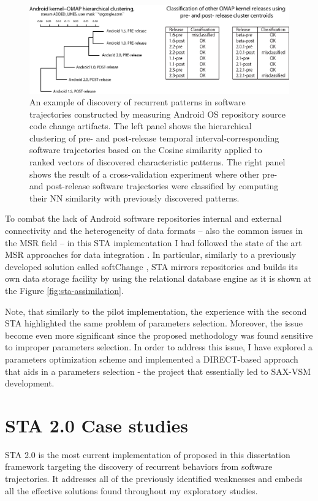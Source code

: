 \begin{figure}[t]
   \centering
   \includegraphics[width=145mm]{figures/STA2.eps}
   \caption{An example of discovery of recurrent patterns in software trajectories constructed by measuring Android OS 
   repository source code change artifacts.
   The left panel shows the hierarchical clustering of pre- and post-release temporal interval-corresponding software 
   trajectories based on the Cosine similarity applied to ranked vectors of discovered characteristic patterns.
   The right panel shows the result of a cross-validation experiment where other pre- and post-release software trajectories 
   were classified by computing their NN similarity with previously discovered patterns.}
   \label{fig:STA2-results}
\end{figure}

To combat the lack of Android software repositories internal and external connectivity and the heterogeneity 
of data formats -- also the common issues in the MSR field -- in this STA implementation I had followed the state of 
the art MSR approaches for data integration \cite{citeulike:13058334} \cite{cvsanaly}. 
In particular, similarly to a previously developed solution called softChange \cite{german04_softchange}, STA mirrors 
repositories and builds its own data storage facility by using the relational database engine as it is shown at 
the Figure \ref{fig:sta-assimilation}.

Note, that similarly to the pilot implementation, the experience with the second STA highlighted the same problem of 
parameters selection. Moreover, the issue become even more significant since the proposed methodology was found sensitive to 
improper parameters selection. In order to address this issue, I have explored a parameters optimization scheme and 
implemented a DIRECT-based approach \cite{citeulike:12563460} that aids in a parameters selection - the project that 
essentially led to SAX-VSM development.

\section{STA 2.0 Case studies}
STA 2.0 is the most current implementation of proposed in this dissertation framework targeting the discovery of recurrent behaviors from software trajectories. It addresses all of the previously identified weaknesses and embeds all the effective solutions found throughout my exploratory studies. 

